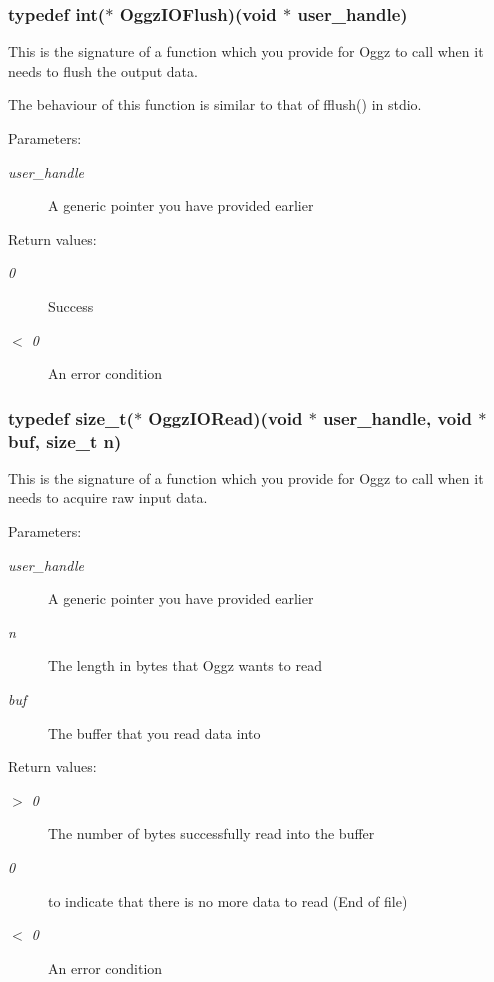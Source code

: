 \subsubsection{\setlength{\rightskip}{0pt plus 5cm}typedef int($\ast$ {\bf Oggz\-IOFlush})(void $\ast$ user\_\-handle)}\label{oggz__io_8h_a4}


This is the signature of a function which you provide for Oggz to call when it needs to flush the output data. 

The behaviour of this function is similar to that of fflush() in stdio.

\begin{Desc}
\item[Parameters:]
\begin{description}
\item[{\em user\_\-handle}]A generic pointer you have provided earlier \end{description}
\end{Desc}
\begin{Desc}
\item[Return values:]
\begin{description}
\item[{\em 0}]Success \item[{\em $<$  0}]An error condition \end{description}
\end{Desc}
\subsubsection{\setlength{\rightskip}{0pt plus 5cm}typedef size\_\-t($\ast$ {\bf Oggz\-IORead})(void $\ast$ user\_\-handle, void $\ast$ buf, size\_\-t n)}\label{oggz__io_8h_a0}


This is the signature of a function which you provide for Oggz to call when it needs to acquire raw input data. 

\begin{Desc}
\item[Parameters:]
\begin{description}
\item[{\em user\_\-handle}]A generic pointer you have provided earlier \item[{\em n}]The length in bytes that Oggz wants to read \item[{\em buf}]The buffer that you read data into \end{description}
\end{Desc}
\begin{Desc}
\item[Return values:]
\begin{description}
\item[{\em $>$  0}]The number of bytes successfully read into the buffer \item[{\em 0}]to indicate that there is no more data to read (End of file) \item[{\em $<$  0}]An error condition \end{description}
\end{Desc}
